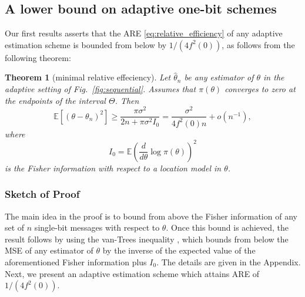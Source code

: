 \documentclass[letterpaper, conference]{IEEEtran}      %
\newtheorem{thm}{\bf{Theorem}}
\begin{document}
\subsection{A lower bound on adaptive one-bit schemes}
Our first results asserts that the ARE \eqref{eq:relative_efficiency} of any adaptive estimation scheme is bounded from below by $1/(4f^2(0))$, as follows from the following theorem:
\begin{thm}[minimal relative effeciency] \label{thm:adpative_lower_bound}
Let $\widehat{\theta}_n$ be any estimator of $\theta$ in the adaptive setting of Fig.~\ref{fig:sequential}.
Assumes that $\pi(\theta)$ converges to zero at the endpoints of the interval $\Theta$. Then
\[
\mathbb E\left[ (\theta-\theta_n)^2 \right] \geq  \frac{\pi \sigma^2 }{2n +\pi \sigma^2  I_0}  =  \frac{\sigma^2}{4f^2(0) n}+o(n^{-1}),
\]
where 
\[
I_0 = \mathbb E \left( \frac{d}{d\theta} \log \pi (\theta) \right)^2
\]
is the Fisher information with respect to a location model in $\theta$. 
\end{thm}

\subsubsection*{Sketch of Proof}
The main idea in the proof is to bound from above the Fisher information of any set of $n$ single-bit messages with respect to $\theta$. Once this bound is achieved, the result follows by using the van-Trees inequality \cite[Thm. 2.13]{tsybakov2008introduction},\cite{gill1995applications} which bounds from below the MSE of any estimator of $\theta$ by the inverse of the expected value of the aforementioned Fisher information plus $I_0$. The details are given in the Appendix.\\

Next, we present an adaptive estimation scheme which attains ARE of $1/(4f^2(0))$. 
\end{document}
